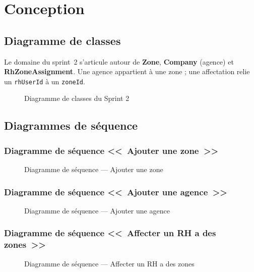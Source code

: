 \section{Conception}

\subsection{Diagramme de classes}

Le domaine du sprint~2 s'articule autour de \textbf{Zone}, \textbf{Company}
(agence) et \textbf{RhZoneAssignment}. Une agence appartient à une zone ;
une affectation relie un \texttt{rhUserId} à un \texttt{zoneId}.

\begin{figure}[H]
  \centering
  \caption{Diagramme de classes du Sprint 2}
  \label{fig:class-sprint2}
\end{figure}


\subsection{Diagrammes de séquence}

\subsubsection{Diagramme de séquence <<~Ajouter une zone~>>}

\begin{figure}[H]
  \centering
  \caption{Diagramme de s\'equence --- Ajouter une zone}
  \label{fig:seq-add-zone}
\end{figure}

\subsubsection{Diagramme de séquence <<~Ajouter une agence~>>}

\begin{figure}[H]
  \centering
  \caption{Diagramme de s\'equence --- Ajouter une agence}
  \label{fig:seq-add-company}
\end{figure}

\subsubsection{Diagramme de séquence <<~Affecter un RH a des zones~>>}

\begin{figure}[H]
  \centering
  \caption{Diagramme de s\'equence --- Affecter un RH a des zones}
  \label{fig:seq-assign-rh}
\end{figure}


